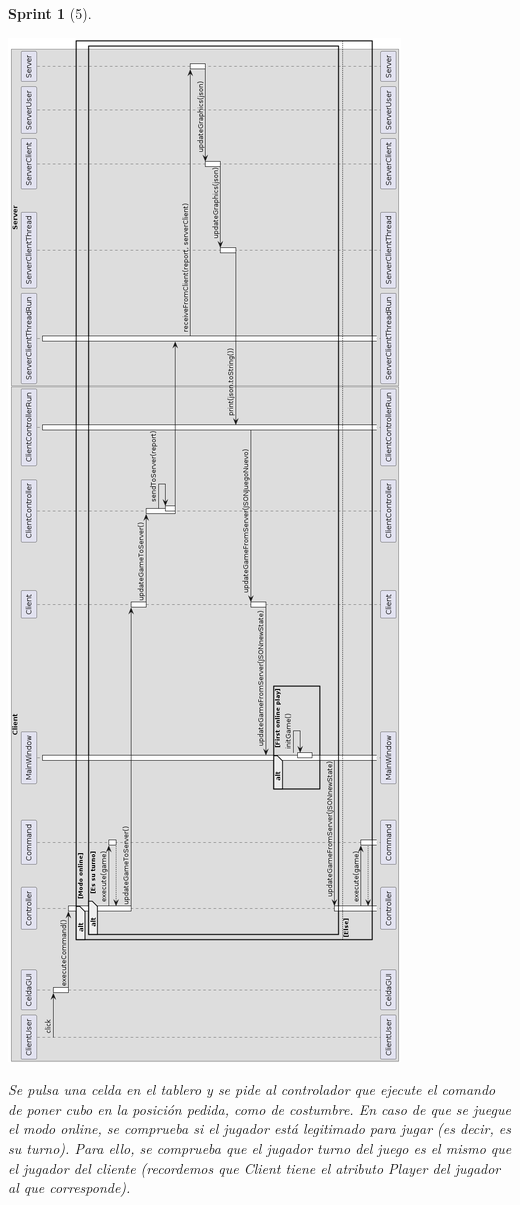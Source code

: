 \documentclass[12pt,a4paper,openright]{book}
\theoremstyle{break}
\newtheorem*{sprint}{Sprint}
\begin{document}
\begin{sprint}[5]
\begin{center}
\includegraphics[scale=0.4]{juegoTipicoUml.png}
\end{center}

Se pulsa una celda en el tablero y se pide al controlador que ejecute el comando de poner cubo en la posición pedida, como de costumbre. En caso de que se juegue el modo online, se comprueba si el jugador está legitimado para jugar (es decir, es su turno). Para ello, se comprueba que el jugador turno del juego es el mismo que el jugador del cliente (recordemos que Client tiene el atributo Player del jugador al que corresponde).


\end{sprint}
\end{document}

